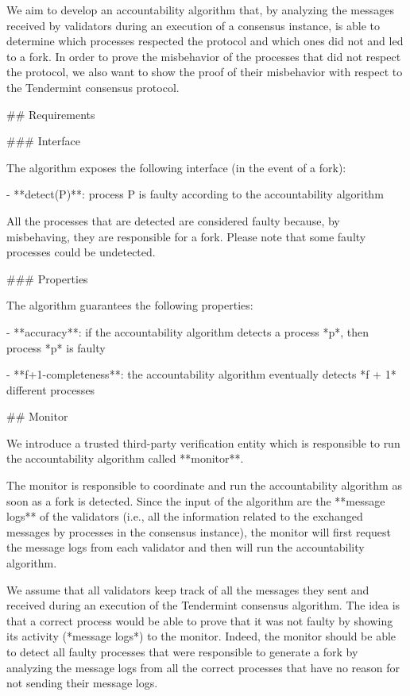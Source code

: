 \documentclass[a4paper,11pt,oneside]{report}
\begin{document}
\begin{markdown}

We aim to develop an accountability algorithm that, by analyzing the messages received by validators during an execution of a consensus instance, is able to determine which processes respected the protocol and which ones did not and led to a fork. 
In order to prove the misbehavior of the processes that did not respect the protocol, we also want to show the proof of their misbehavior with respect to the Tendermint consensus protocol.


## Requirements

### Interface

The algorithm exposes the following interface (in the event of a fork):

- **detect(P)**: process P is faulty according to the accountability algorithm

All the processes that are detected are considered faulty because, by misbehaving, they are responsible for a fork.
Please note that some faulty processes could be undetected. 

### Properties

The algorithm guarantees the following properties:

- **accuracy**: if the accountability algorithm detects a process *p*, then process *p* is faulty

- **f+1-completeness**: the accountability algorithm eventually detects *f + 1* different processes

## Monitor

We introduce a trusted third-party verification entity which is responsible to run the accountability algorithm called **monitor**.

The monitor is responsible to coordinate and run the accountability algorithm as soon as a fork is detected. 
Since the input of the algorithm are the **message logs** of the validators (i.e., all the information related to the exchanged messages by processes in the consensus instance), the monitor will first request the message logs from each validator and then will run the accountability algorithm.

We assume that all validators keep track of all the messages they sent and received during an execution of the Tendermint consensus algorithm. 
The idea is that a correct process would be able to prove that it was not faulty by showing its activity (*message logs*) to the monitor.
Indeed, the monitor should be able to detect all faulty processes that were responsible to generate a fork by analyzing the message logs from all the correct processes that have no reason for not sending their message logs.


\end{markdown}
\end{document}
